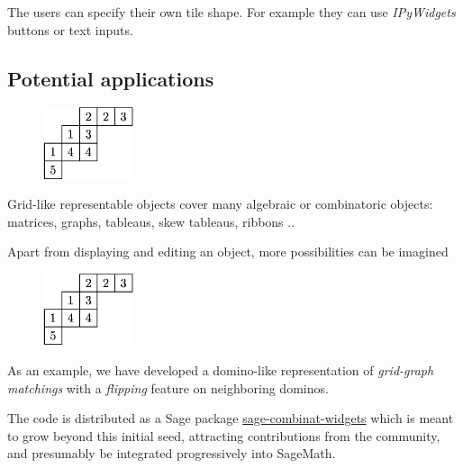 \documentclass{deliverablereport}
\begin{document}
The users can specify their own tile shape. For example they can
use \emph{IPyWidgets} buttons or text inputs.

\subsection{Potential applications}

\begin{figure}
    \begin{center}
      \includegraphics[width=100px]{images/JDTSlide}
\end{center}
\end{figure}

Grid-like representable objects cover many algebraic or combinatoric
objects: matrices, graphs, tableaus, skew tableaus, ribbons ..

Apart from displaying and editing an object, more possibilities can be
imagined


\begin{figure}
    \begin{center}
      \includegraphics[width=100px]{images/JDTSlide}
\end{center}
\end{figure}

As an example, we have developed a domino-like representation of
\emph{grid-graph matchings} with a \emph{flipping} feature on neighboring dominos.


The code is distributed as a Sage package
\href{https://github.com/sagemath/sage-combinat-widgets/}{sage-combinat-widgets}
which is meant to grow beyond this initial seed, attracting
contributions from the community, and presumably be integrated
progressively into SageMath.
\end{document}
